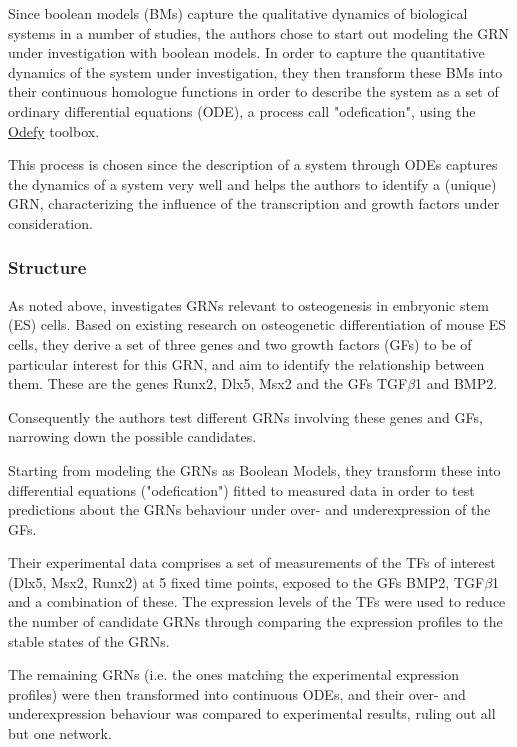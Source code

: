 \documentclass[11pt]{article}
\begin{document}
Since boolean models (BMs) capture the qualitative dynamics of biological systems in a number of studies, the authors chose to start out modeling the GRN under investigation with boolean models.
In order to capture the quantitative dynamics of the system under investigation, they then transform these BMs into their continuous homologue functions in order to describe the system as a set of ordinary differential equations (ODE), a process call "odefication", using the \href{http://www.helmholtz-muenchen.de/icb/software/odefy/index.html}{Odefy} toolbox.

This process is chosen since the description of a system through ODEs captures the dynamics of a system very well and helps the authors to identify a (unique) GRN, characterizing the influence of the transcription and growth factors under consideration.

\subsubsection{Structure}
As noted above, \cite{Kirkham} investigates GRNs relevant to osteogenesis in embryonic stem (ES) cells. Based on existing research on osteogenetic differentiation of mouse ES cells, they derive a set of three genes and two growth factors (GFs) to be of particular interest for this GRN, and aim to identify the relationship between them. 
These are the genes Runx2, Dlx5, Msx2 and the GFs TGF$\beta$1 and BMP2.

Consequently the authors test different GRNs involving these genes and GFs, narrowing down the possible candidates. 

Starting from modeling the GRNs as Boolean Models, they transform these into differential equations ("odefication") fitted to measured data in order to test predictions about the GRNs behaviour under over- and underexpression of the GFs. 

Their experimental data comprises a set of measurements of the TFs of interest (Dlx5, Msx2, Runx2) at 5 fixed time points, exposed to the GFs BMP2, TGF$\beta$1 and a combination of these.
The expression levels of the TFs were used to reduce the number of candidate GRNs through comparing the expression profiles to the stable states of the GRNs.

The remaining GRNs (i.e. the ones matching the experimental expression profiles) were then transformed into continuous ODEs, and their over- and underexpression behaviour was compared to experimental results, ruling out all but one network.
\end{document}
